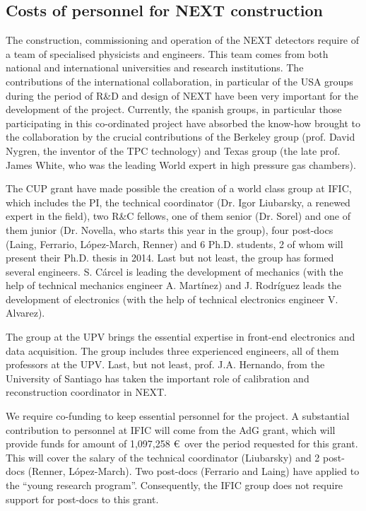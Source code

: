 \subsection{Costs of personnel for NEXT construction}

The construction, commissioning and operation of the NEXT detectors require of a team of specialised physicists and engineers. This team comes from both national and international universities and research institutions. The contributions of the international collaboration, in particular of the USA groups during the period of R\&D and design of NEXT have been very important for the development of the project. Currently, the spanish groups, in particular those participating in this co-ordinated project have absorbed the know-how brought to the collaboration by the crucial contributions of the Berkeley group (prof. David Nygren, the inventor of the TPC technology) and Texas group (the late prof. James White, who was the leading World expert in high pressure gas chambers). 

The CUP grant have made possible the creation of a world class group at IFIC, which includes the PI, the technical coordinator (Dr. Igor Liubarsky, a renewed expert in the field), two R\&C fellows, one of them senior (Dr. Sorel) and one of them junior (Dr. Novella, who starts this year in the group), four post-docs  (Laing, Ferrario, L\'opez-March,  Renner) and 6 Ph.D. students, 2 of whom will present their Ph.D. thesis in 2014. Last but not least, the group has formed several engineers. S. C\'arcel is leading the development of mechanics (with the help of technical mechanics engineer A. Mart\'inez) and J. Rodr\'iguez leads the development of electronics (with the help of technical electronics engineer V. Alvarez).

The group at the UPV brings the essential expertise in front-end electronics and data acquisition. The group includes three experienced engineers, all of them professors at the UPV. Last, but not least, prof. J.A. Hernando, from the University of Santiago has taken the important role of calibration and reconstruction coordinator in NEXT. 

We require co-funding to keep essential personnel for the project. A substantial contribution to personnel at IFIC will come from the  AdG grant, which will provide funds for amount of 1,097,258 \euro\ over the period requested for this grant. This will cover the salary of the technical coordinator (Liubarsky) and 2 post-docs (Renner, López-March). Two post-docs (Ferrario and Laing) have applied to the ``young research program''.  Consequently, the IFIC group does not require support for post-docs to this grant.  

